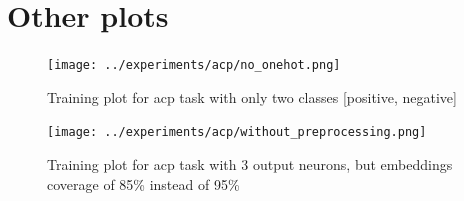 \documentclass{article}
\begin{document}
    \section{Other plots}\label{sec:s7}
            \begin{figure}
                \texttt{[image: ../experiments/acp/no\_onehot.png]}
                \caption{Training plot for acp task with only two classes [positive, negative]}
                \label{fig:train-acd-no-onehot}
            \end{figure}
                \begin{figure}
                \texttt{[image: ../experiments/acp/without\_preprocessing.png]}
                \caption{Training plot for acp task with 3 output neurons, but embeddings coverage of 85\% instead of 95\%}
                \label{fig:train-acd-no-preprocessing}
            \end{figure}
\end{document}
